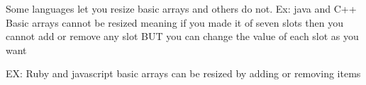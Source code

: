 Some languages let you resize basic arrays and others do not.
  Ex: 
  java and C++
    Basic arrays cannot be resized 
    meaning if you made it of seven slots then you cannot add or remove any slot 
    BUT you can change the value of each slot as you want

  EX:
  Ruby and javascript
    basic arrays can be resized by adding or removing items 
